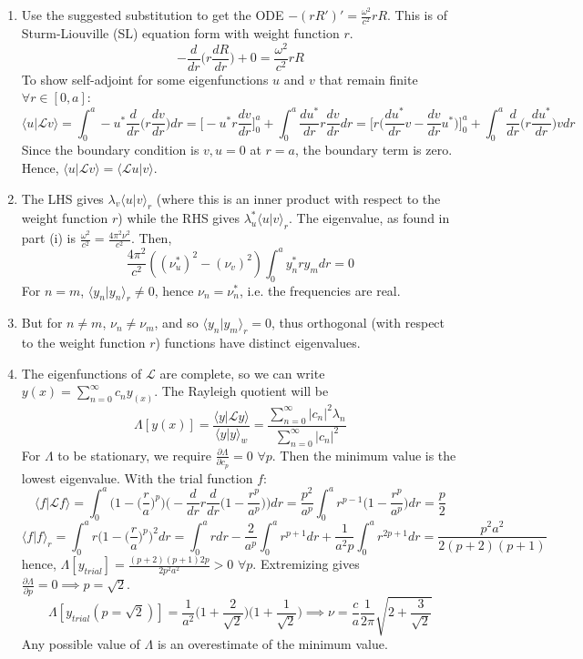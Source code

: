 \documentclass[a4paper]{article}
\begin{document}
\begin{ans}\leavevmode
\begin{enumerate}[label=(\roman*)]
\item Use the suggested substitution to get the ODE $-(rR')'=\frac{\omega^2}{c^2}rR$. This is of Sturm-Liouville (SL) equation form with weight function $r$. 
$$-\frac{d}{dr}\bigg(r\frac{dR}{dr}\bigg)+0=\frac{\omega^2}{c^2}rR$$
To show self-adjoint for some eigenfunctions $u$ and $v$ that remain finite $\forall r\in[0,a]$:
$$\langle u|\mathcal{L}v\rangle=\int_0^a-u^*\frac{d}{dr}\bigg(r\frac{dv}{dr}\bigg)dr=\bigg[-u^*r\frac{dv}{dr}\bigg]_0^a+\int_0^a\frac{du^*}{dr}r\frac{dv}{dr}dr=\bigg[r\bigg(\frac{du^*}{dr}v-\frac{dv}{dr}u^*\bigg)\bigg]_0^a+\int_0^a\frac{d}{dr}\bigg(r\frac{du^*}{dr}\bigg)vdr$$
Since the boundary condition is $v,u=0$ at $r=a$, the boundary term is zero. Hence, $\langle u|\mathcal{L}v\rangle=\langle\mathcal{L}u|v\rangle$.
\item The LHS gives $\lambda_v\langle u|v\rangle_r$ (where this is an inner product with respect to the weight function $r$) while the RHS gives $\lambda_u^*\langle u|v\rangle_r$. The eigenvalue, as found in part (i) is $\frac{\omega^2}{c^2}=\frac{4\pi^2\nu^2}{c^2}$. Then,
$$\frac{4\pi^2}{c^2}((\nu_u^*)^2-(\nu_v)^2)\int_0^ay_n^*ry_mdr=0$$
For $n=m$, $\langle y_n|y_n\rangle_r\neq 0$, hence $\nu_n=\nu_n^*$, i.e. the frequencies are real. 
\item But for $n\neq m$, $\nu_n\neq\nu_m$, and so $\langle y_n|y_m\rangle_r=0$, thus orthogonal (with respect to the weight function $r$) functions have distinct eigenvalues.
\item The eigenfunctions of $\mathcal{L}$ are complete, so we can write $y(x)=\sum_{n=0}^\infty c_ny_(x)$. The Rayleigh quotient will be
$$\Lambda[y(x)]=\frac{\langle y|\mathcal{L}y\rangle}{\langle y|y\rangle_w}=\frac{\sum_{n=0}^\infty|c_n|^2\lambda_n}{\sum_{n=0}^\infty |c_n|^2}$$
For $\Lambda$ to be stationary, we require $\frac{\partial\Lambda}{\partial c_p}=0$ $\forall p$. Then the minimum value is the lowest eigenvalue. With the trial function $f$:
$$\langle f|\mathcal{L}f\rangle=\int_0^a\bigg(1-\bigg(\frac{r}{a}\bigg)^p\bigg)\bigg(-\frac{d}{dr}r\frac{d}{dr}\bigg(1-\frac{r^p}{a^p}\bigg)\bigg)dr=\frac{p^2}{a^p}\int_0^ar^{p-1}\bigg(1-\frac{r^p}{a^p}\bigg)dr=\frac{p}{2}$$
$$\langle f|f\rangle_r=\int_0^ar\bigg(1-\bigg(\frac{r}{a}\bigg)^p\bigg)^2dr=\int_0^ardr-\frac{2}{a^p}\int_0^ar^{p+1}dr+\frac{1}{a^2p}\int_0^ar^{2p+1}dr=\frac{p^2a^2}{2(p+2)(p+1)}$$
hence, $\Lambda[y_{trial}]=\frac{(p+2)(p+1)2p}{2p^2a^2}>0$ $\forall p$. Extremizing gives $\frac{\partial\Lambda}{\partial p}=0\implies p=\sqrt{2}$.
$$\Lambda[y_{trial}(p=\sqrt{2})]=\frac{1}{a^2}\bigg(1+\frac{2}{\sqrt{2}}\bigg)\bigg(1+\frac{1}{\sqrt{2}}\bigg)\implies\nu=\frac{c}{a}\frac{1}{2\pi}\sqrt{2+\frac{3}{\sqrt{2}}}$$
Any possible value of $\Lambda$ is an overestimate of the minimum value.
\end{enumerate}
\end{ans}
\newpage
\end{document}
